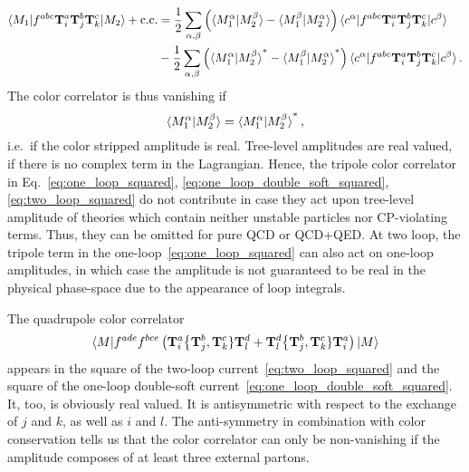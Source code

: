 \documentclass[a4paper,11pt]{article}
\begin{document}
\begin{equation}
\begin{split}
\braket{M_1| f^{abc} \mathbf{T}_i^a \mathbf{T}_j^b \mathbf{T}_k^c | M_2} + \text{c.c.} &= \frac{1}{2} \sum_{\alpha, \beta} \left(\braket{M_1^\alpha| M_2^\beta} - \braket{M_1^\beta|M_2^\alpha} \right) \braket{c^\alpha| f^{abc} \mathbf{T}_i^a \mathbf{T}_j^b \mathbf{T}_k^c| c^\beta} \\
& - \frac{1}{2} \sum_{\alpha, \beta} \left(\braket{M_1^\alpha| M_2^\beta}^* - \braket{M_1^\beta|M_2^\alpha}^* \right) \braket{c^\alpha| f^{abc} \mathbf{T}_i^a \mathbf{T}_j^b \mathbf{T}_k^c| c^\beta}.
\end{split}
\end{equation}
The color correlator is thus vanishing if
\begin{equation}
\braket{M_1^\alpha| M_2^\beta} = \braket{M_1^\alpha|M_2^\beta}^*,
\end{equation}
i.e.\ if the color stripped amplitude is real. Tree-level amplitudes are real valued, if there is no complex term in the Lagrangian. Hence, the tripole color correlator in Eq.~\eqref{eq:one_loop_squared}, \eqref{eq:one_loop_double_soft_squared}, \eqref{eq:two_loop_squared} do not contribute in case they act upon tree-level amplitude of theories which contain neither unstable particles nor CP-violating terms. Thus, they can be omitted for pure QCD or QCD+QED. At two loop, the tripole term in the one-loop~\eqref{eq:one_loop_squared} can also act on one-loop amplitudes, in which case the amplitude is not guaranteed to be real in the physical phase-space due to the appearance of loop integrals.

The quadrupole color correlator
\begin{equation}
\braket{M| f^{ade} f^{bce} \left(\mathbf{T}_i^a \big \lbrace \mathbf{T}_j^b, \mathbf{T}_k^c \rbrace \mathbf{T}_l^d  + \mathbf{T}_l^d \big \lbrace \mathbf{T}_j^b, \mathbf{T}_k^c \rbrace \mathbf{T}_i^a \right)| M}
\end{equation}
appears in the square of the two-loop current~\eqref{eq:two_loop_squared} and the square of the one-loop double-soft current~\eqref{eq:one_loop_double_soft_squared}. It, too, is obviously real valued. It is antisymmetric with respect to the exchange of $j$ and $k$, as well as $i$ and $l$. The anti-symmetry in combination with color conservation tells us that the color correlator can only be non-vanishing if the amplitude composes of at least three external partons.

\newpage


\end{document}
